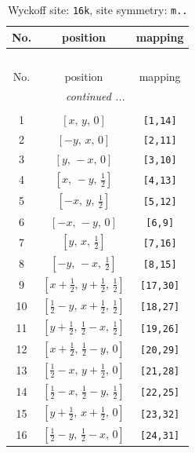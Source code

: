\documentclass[fleqn,8pt]{jsarticle}
\begin{document}
\renewcommand{\arraystretch}{1.2}
\begin{longtable}{ccc}
\caption{Wyckoff site: {\tt 16k}, site symmetry: {\tt m..}}
 \\
 \hline \hline
No. & position & mapping \\ \hline \endfirsthead

\multicolumn{2}{l}{\tablename\ \thetable{}} \\
 \hline \hline
No. & position & mapping \\ \hline \endhead

 \hline \hline
\multicolumn{2}{r}{\footnotesize\it continued ...} \\ \endfoot

 \hline \hline
\multicolumn{2}{r}{} \\ \endlastfoot

1 & $\left[ x,\, y,\, 0 \right]$ & {\tt [1,14]} \\ \hline
2 & $\left[ - y,\, x,\, 0 \right]$ & {\tt [2,11]} \\ \hline
3 & $\left[ y,\, - x,\, 0 \right]$ & {\tt [3,10]} \\ \hline
4 & $\left[ x,\, - y,\, \frac{1}{2} \right]$ & {\tt [4,13]} \\ \hline
5 & $\left[ - x,\, y,\, \frac{1}{2} \right]$ & {\tt [5,12]} \\ \hline
6 & $\left[ - x,\, - y,\, 0 \right]$ & {\tt [6,9]} \\ \hline
7 & $\left[ y,\, x,\, \frac{1}{2} \right]$ & {\tt [7,16]} \\ \hline
8 & $\left[ - y,\, - x,\, \frac{1}{2} \right]$ & {\tt [8,15]} \\ \hline
9 & $\left[ x + \frac{1}{2},\, y + \frac{1}{2},\, \frac{1}{2} \right]$ & {\tt [17,30]} \\ \hline
10 & $\left[ \frac{1}{2} - y,\, x + \frac{1}{2},\, \frac{1}{2} \right]$ & {\tt [18,27]} \\ \hline
11 & $\left[ y + \frac{1}{2},\, \frac{1}{2} - x,\, \frac{1}{2} \right]$ & {\tt [19,26]} \\ \hline
12 & $\left[ x + \frac{1}{2},\, \frac{1}{2} - y,\, 0 \right]$ & {\tt [20,29]} \\ \hline
13 & $\left[ \frac{1}{2} - x,\, y + \frac{1}{2},\, 0 \right]$ & {\tt [21,28]} \\ \hline
14 & $\left[ \frac{1}{2} - x,\, \frac{1}{2} - y,\, \frac{1}{2} \right]$ & {\tt [22,25]} \\ \hline
15 & $\left[ y + \frac{1}{2},\, x + \frac{1}{2},\, 0 \right]$ & {\tt [23,32]} \\ \hline
16 & $\left[ \frac{1}{2} - y,\, \frac{1}{2} - x,\, 0 \right]$ & {\tt [24,31]} \\
\end{longtable}
\end{document}
